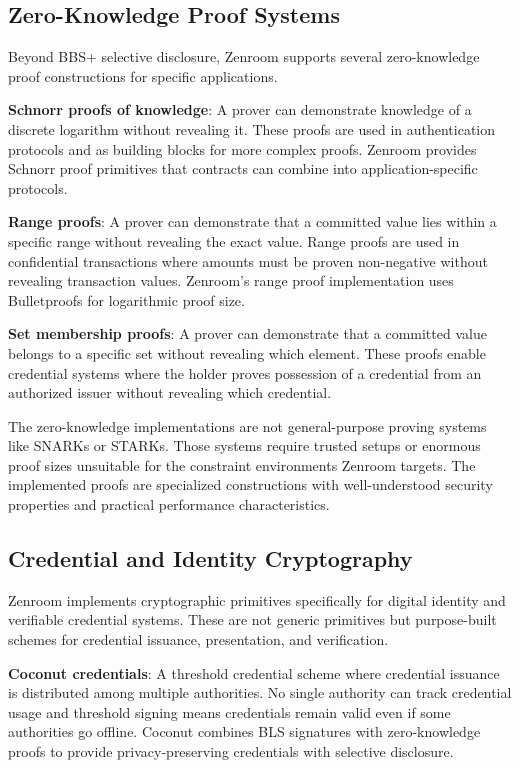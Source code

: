 \subsection{Zero-Knowledge Proof Systems}

Beyond BBS+ selective disclosure, Zenroom supports several
zero-knowledge proof constructions for specific applications.

\textbf{Schnorr proofs of knowledge}: A prover can demonstrate
knowledge of a discrete logarithm without revealing it. These proofs
are used in authentication protocols and as building blocks for more
complex proofs. Zenroom provides Schnorr proof primitives that
contracts can combine into application-specific protocols.

\textbf{Range proofs}: A prover can demonstrate that a committed value
lies within a specific range without revealing the exact value. Range
proofs are used in confidential transactions where amounts must be
proven non-negative without revealing transaction values. Zenroom's
range proof implementation uses Bulletproofs for logarithmic proof
size.

\textbf{Set membership proofs}: A prover can demonstrate that a
committed value belongs to a specific set without revealing which
element. These proofs enable credential systems where the holder
proves possession of a credential from an authorized issuer without
revealing which credential.

The zero-knowledge implementations are not general-purpose proving
systems like SNARKs or STARKs. Those systems require trusted setups or
enormous proof sizes unsuitable for the constraint environments
Zenroom targets. The implemented proofs are specialized constructions
with well-understood security properties and practical performance
characteristics.

\subsection{Credential and Identity Cryptography}

Zenroom implements cryptographic primitives specifically for digital
identity and verifiable credential systems. These are not generic
primitives but purpose-built schemes for credential issuance,
presentation, and verification.

\textbf{Coconut credentials}: A threshold credential scheme where
credential issuance is distributed among multiple authorities. No
single authority can track credential usage and threshold signing
means credentials remain valid even if some authorities go
offline. Coconut combines BLS signatures with zero-knowledge proofs to
provide privacy-preserving credentials with selective disclosure.

